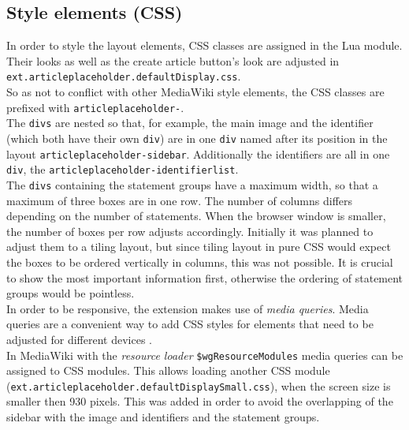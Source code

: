 \subsection{Style elements (CSS)}

In order to style the layout elements, CSS classes are assigned in the Lua module. Their looks as well as the create article button's look are adjusted in \texttt{ext.articleplaceholder.defaultDisplay.css}. \\
So as not to conflict with other MediaWiki style elements, the CSS classes are prefixed with \texttt{\justify articleplaceholder-}. \\
The \texttt{\justify divs} are nested so that, for example, the main image and the identifier (which both have their own \texttt{div}) are in one \texttt{div} named after its position in the layout \texttt{\justify articleplaceholder-sidebar}. Additionally the identifiers are all in one \texttt{div}, the \texttt{\justify articleplaceholder-identifierlist}. \\
The \texttt{divs} containing the statement groups have a maximum width, so that a maximum of three boxes are in one row. The number of columns differs depending on the number of statements. When the browser window is smaller, the number of boxes per row adjusts accordingly. Initially it was planned to adjust them to a tiling layout, but since tiling layout in pure CSS would expect the boxes to be ordered vertically in columns, this was not possible.  It is crucial to show the most important information first, otherwise the ordering of statement groups would be pointless. \\
In order to be responsive, the extension makes use of \textit{media queries}. Media queries are a convenient way to add CSS styles for elements that need to be adjusted for different devices \citep[43]{mediaquery}.\\
In MediaWiki with the \textit{resource loader} \texttt{\justify \$wgResourceModules} media queries can be assigned to CSS modules. This allows loading another CSS module (\texttt{\justify ext.articleplaceholder.defaultDisplaySmall.css}), when the screen size is smaller then 930 pixels. This was added in order to avoid the overlapping of the sidebar with the image and identifiers and the statement groups.